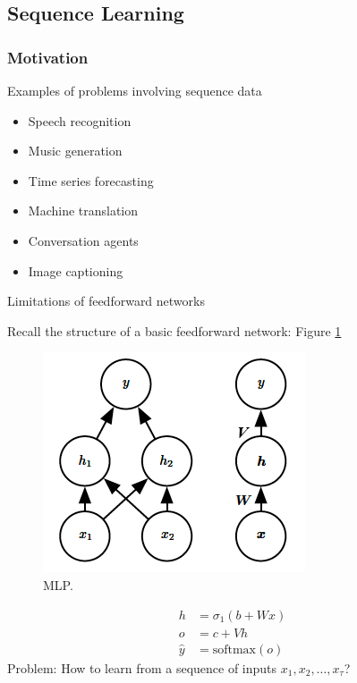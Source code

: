 \documentclass[english]{article}
\begin{document}
\eenum 

\subsection{Sequence Learning}

\subsubsection{Motivation} %
\benum
\item 
 {Examples of problems involving sequence data}
\begin{itemize}
\item Speech recognition
\item Music generation
\item Time series forecasting
\item Machine translation
\item Conversation agents
\item Image captioning
\end{itemize}
 

\item 
 {Limitations of feedforward networks}

Recall the structure of a basic feedforward network:  Figure \ref{MLP}
\begin{figure}
  \centering
\includegraphics[width=0.4\linewidth]{mlp.png}
    \caption{MLP.}
    \label{MLP}
\end{figure}

\begin{align*}
h &= \sigma_1(b+Wx)\\
o &= c+Vh\\
\hat{y} &= \text{softmax}(o)
\end{align*}
Problem: How to learn from a sequence of inputs $x_1, x_2,\dots,x_\tau$?
\end{document}
